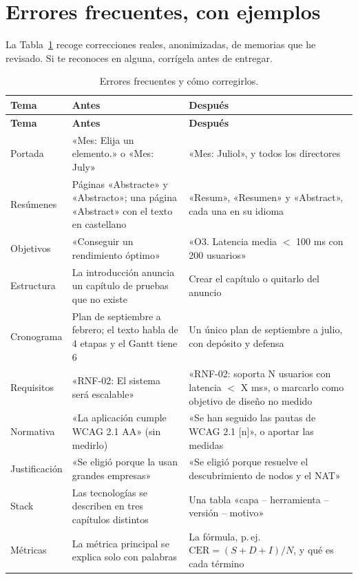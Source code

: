 \documentclass[11pt,a4paper]{article}
\begin{document}
\section{Errores frecuentes, con ejemplos}
\label{sec:errores}

La Tabla~\ref{tab:errores} recoge correcciones reales, anonimizadas, de memorias
que he revisado. Si te reconoces en alguna, corrígela antes de entregar.

{\small
\begin{longtable}{@{}p{3.0cm}p{5.8cm}p{5.8cm}@{}}
  \caption{Errores frecuentes y cómo corregirlos.}\label{tab:errores}\\
  \toprule
  \textbf{Tema} & \textbf{Antes} & \textbf{Después} \\
  \midrule
  \endfirsthead
  \toprule
  \textbf{Tema} & \textbf{Antes} & \textbf{Después} \\
  \midrule
  \endhead
  \bottomrule
  \endfoot
  Portada & «Mes: Elija un elemento.» o «Mes: July» & «Mes: Juliol», y todos los directores \\
  Resúmenes & Páginas «Abstracte» y «Abstracto»; una página «Abstract» con el texto en castellano & «Resum», «Resumen» y «Abstract», cada una en su idioma \\
  Objetivos & «Conseguir un rendimiento óptimo» & «O3. Latencia media $<$ 100 ms con 200 usuarios» \\
  Estructura & La introducción anuncia un capítulo de pruebas que no existe & Crear el capítulo o quitarlo del anuncio \\
  Cronograma & Plan de septiembre a febrero; el texto habla de 4 etapas y el Gantt tiene 6 & Un único plan de septiembre a julio, con depósito y defensa \\
  Requisitos & «RNF-02: El sistema será escalable» & «RNF-02: soporta N usuarios con latencia $<$ X ms», o marcarlo como objetivo de diseño no medido \\
  Normativa & «La aplicación cumple WCAG 2.1 AA» (sin medirlo) & «Se han seguido las pautas de WCAG 2.1 [n]», o aportar las medidas \\
  Justificación & «Se eligió porque la usan grandes empresas» & «Se eligió porque resuelve el descubrimiento de nodos y el NAT» \\
  Stack & Las tecnologías se describen en tres capítulos distintos & Una tabla «capa -- herramienta -- versión -- motivo» \\
  Métricas & La métrica principal se explica solo con palabras & La fórmula, p.\,ej. $\mathrm{CER} = (S + D + I)/N$, y qué es cada término \\

\end{longtable}}
\end{document}
